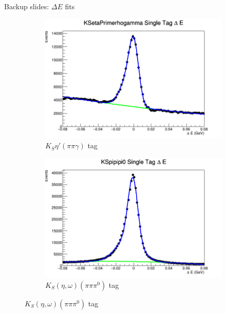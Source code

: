 \documentclass{beamer}
\begin{document}
\begin{frame}{Backup slides: $\Delta E$ fits}
  \begin{figure}
    \centering
    \vspace{-0.2cm}
    \begin{subfigure}{0.5\textwidth}
      \includegraphics[width = 1\textwidth]{KSetaPrimerhogammaDeltaE.png}
      \caption{$K_S\eta'(\pi\pi\gamma)$ tag}
    \end{subfigure}%
    \begin{subfigure}{0.5\textwidth}
      \includegraphics[width = 1\textwidth]{KSpipipi0DeltaE.png}
      \caption{$K_S(\eta, \omega)(\pi\pi\pi^0)$ tag}
    \end{subfigure}
  \end{figure}
\end{frame}
\end{document}

